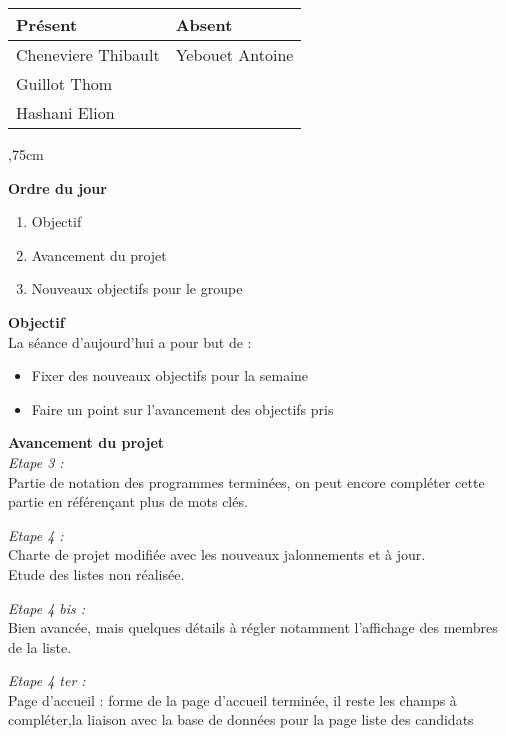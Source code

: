 \vskip 0.75cm

\begin{center}
\begin{tabular}[]{|l|l|}
     \hline 
     Présent & Absent\\
     \hline
     Cheneviere Thibault & Yebouet Antoine\\ 
     Guillot Thom &\\ Hashani Elion &\\
     \hline
\end{tabular}
\end{center}


,75cm

\noindent
\textbf{Ordre du jour}

\begin{enumerate}
    \item Objectif
    \item Avancement du projet
    \item Nouveaux objectifs pour le groupe
\end{enumerate}

\vskip 0.25cm

\noindent
\textbf{Objectif}\\
\noindent
La séance d'aujourd'hui a pour but de :
\begin{itemize}
    \item Fixer des nouveaux objectifs pour la semaine
    \item Faire un point sur l’avancement des objectifs pris
\end{itemize}

\vskip 0.25cm

\noindent
\textbf{Avancement du projet}\\
\noindent
\textit{Etape 3 :}\\
Partie de notation des programmes terminées, on peut encore compléter cette partie en référençant plus de mots clés.
 
\vskip 0.25cm
\noindent
\textit{Etape 4 :}\\
Charte de projet modifiée avec les nouveaux jalonnements et à jour.\\
Etude des listes non réalisée.

\vskip 0.25cm
\noindent
\textit{Etape 4 bis :}\\
Bien avancée, mais quelques détails à régler notamment l'affichage des membres de la liste.

\vskip 0.25cm
\noindent
\textit{Etape 4 ter :}\\
Page d’accueil : forme de la page d’accueil terminée, il reste les champs à compléter,la liaison avec la base de données pour la page liste des candidats


